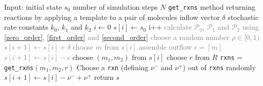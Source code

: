 \begin{algorithm}[!h]
    \caption{}
    \begin{footnotesize}
    \begin{algorithmic}[1]
        \State Input: 
        \State \hspace{1cm} initial state $s_0$
        \State \hspace{1cm} number of simulation steps $N$
        \State \hspace{1cm}  \texttt{get\_rxns} method returning reactions by applying a template to a pair of molecules
        \State \hspace{1cm} inflow vector $\delta$
        \State \hspace{1cm} stochastic rate constants $k_0$, $k_1$ and $k_2$
        \State $i \leftarrow 0$ 
        \State $s[i] \leftarrow s_0$
            \State i++
            \State \textcolor{gray}{calculate $\mathcal{P}_0$, $\mathcal{P}_1$ and $\mathcal{P}_2$ using \eqref{zero_order}, \eqref{first_order} and \eqref{second_order} }
            \State \textcolor{gray}{choose a random number $\rho \in [0,1)$}
             \textcolor{gray}{}
                \State \textcolor{gray}{$s[i+1] \leftarrow s[i] + \delta$ }
        	 \textcolor{gray}{}
                \State \textcolor{gray}{choose $m$ from $s[i]$  }
        		\State \textcolor{gray}{assemble outflow $\epsilon = [m]$}
                \State \textcolor{gray}{$s[i+1] \leftarrow s[i] - \epsilon$} \textcolor{gray}{}
            \Else {}
		    	\State choose $(m_1, m_2)$ from $s[i]$  
	        	\State choose $r$ from $R$ 
	        	\State \texttt{rxns} = \texttt{get\_rxns}$(m_1, m_2, r)$ 
		    	    \State Choose a \texttt{rxn} (defining $\nu^-$ and $\nu^+$) out of \texttt{rxns} randomly
		    	    \State $s[i+1] \leftarrow s[i] - \nu^- + \nu^+$  
		        \EndIf
            \EndIf
        \EndWhile
        \State return $s$
    \end{algorithmic}
    \end{footnotesize}
    \label{generate_network}
\end{algorithm}

